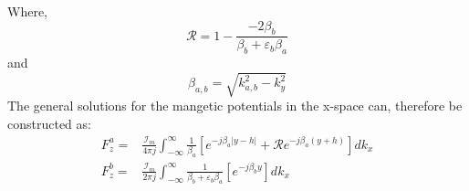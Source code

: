 \documentclass{article}
\begin{document}
  Where,
  \begin{equation}
    \mathcal{R} = 1 - \frac{-2\beta_b}{\beta_b + \varepsilon_b \beta_a}
  \end{equation}
  and
  \begin{equation}
    \beta_{a,b} = \sqrt{k_{a,b}^2 - k_y^2}
  \end{equation}
The general solutions for the mangetic potentials in the x-space can, therefore be constructed as:
\begin{subequations}
  \begin{align}
    F_z^a ={}& \frac{\mathcal{I}_m}{4 \pi j}\int_{-\infty}^{\infty} \frac{1}{\beta_a} \left[ e^{-j \beta_a |y - h|} + \mathcal{R} e^{-j \beta_a (y + h)} \right] dk_x \\
    F_z^b ={}& \frac{\mathcal{I}_m}{2 \pi j}\int_{-\infty}^{\infty} \frac{1}{\beta_b + \varepsilon_b \beta_a} \left[e^{-j \beta_b y} \right] dk_x
  \end{align}
\end{subequations}
\end{document}
